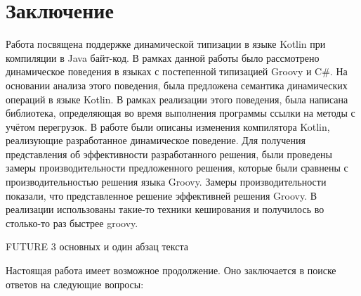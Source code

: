 \vfill
\clearpage
\section*{Заключение}


Работа посвящена поддержке динамической типизации в языке Kotlin при компиляции в Java байт-код.
В рамках данной работы было рассмотрено динамическое поведения в языках с постепенной типизацией Groovy и C\#. На основании анализа этого поведения, была предложена семантика динамических операций в языке Kotlin. В рамках реализации этого поведения, была написана библиотека, определяющая во время выполнения программы ссылки на методы с учётом перегрузок. В работе были описаны изменения компилятора Kotlin, реализующие разработанное динамическое поведение. Для получения представления об эффективности разработанного решения, были проведены замеры производительности предложенного решения, которые были сравнены с производительностью решения языка Groovy.
Замеры производительности показали, что представленное решение эффективней решения Groovy.
В реализации использованы такие-то техники кеширования и получилось во столько-то раз быстрее groovy.

FUTURE 3 основных и один абзац текста

Настоящая работа имеет возможное продолжение. Оно заключается в поиске ответов на следующие вопросы:

